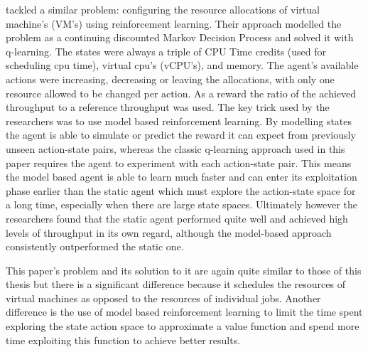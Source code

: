 \cite{vconf} tackled a similar problem: configuring the resource allocations of virtual machine's (VM's) using reinforcement learning. Their approach modelled the problem as a continuing discounted Markov Decision Process and solved it with q-learning. The states were always a triple of CPU Time credits (used for scheduling cpu time), virtual cpu's (vCPU's), and memory. The agent's available actions were increasing, decreasing or leaving the allocations, with only one resource allowed to be changed per action. As a reward the ratio of the achieved throughput to a reference throughput was used. The key trick used by the researchers was to use model based reinforcement learning. By modelling states the agent is able to simulate or predict the reward it can expect from previously unseen action-state pairs, whereas the classic q-learning approach used in this paper requires the agent to experiment with each action-state pair. This means the model based agent is able to learn much faster and can enter its exploitation phase earlier than the static agent which must explore the action-state space for a long time, especially when there are large state spaces. Ultimately however the researchers found that the static agent performed quite well and achieved high levels of throughput in its own regard, although the model-based approach consistently outperformed the static one. 

This paper's problem and its solution to it are again quite similar to those of this thesis but there is a significant difference because it schedules the resources of virtual machines as opposed to the resources of individual jobs. Another difference is the use of model based reinforcement learning to limit the time spent exploring the state action space to approximate a value function and spend more time exploiting this function to achieve better results. 

